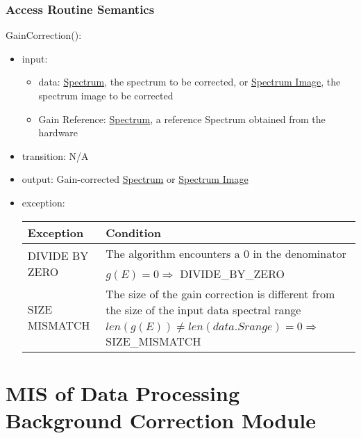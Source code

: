 \documentclass[12pt, titlepage]{article}
\begin{document}
\subsubsection{Access Routine Semantics}
\noindent GainCorrection():
\begin{itemize}
    \item input: 
    \begin{itemize}
        \item data: \hyperref[Mod:Spectrum]{Spectrum}, the spectrum to be
        corrected, or \hyperref[Mod:SI]{Spectrum Image}, the spectrum image to be
        corrected
        \item Gain Reference: \hyperref[Mod:Spectrum]{Spectrum}, a reference
        Spectrum obtained from the hardware
    \end{itemize}
    \item transition: N/A
    \item output: Gain-corrected \hyperref[Mod:Spectrum]{Spectrum} or
    \hyperref[Mod:SI]{Spectrum Image}
    \item exception:
    \begin{center}
        \begin{tabular}{p{3.5cm} p{12cm}}
            \toprule[0.15em]
            \textbf{Exception} & \textbf{Condition}\\
            \midrule[0.1em]
            \multirow{2}{0.25\textwidth}{DIVIDE BY ZERO} & The algorithm
            encounters a 0 in the denominator\\ 
            & $g(E) = 0 \Rightarrow$ DIVIDE\_BY\_ZERO\\ 
            \midrule[0.05em]
            \multirow{2}{0.25\textwidth}{SIZE MISMATCH} & The size of the gain
            correction is different from the size of the input data spectral range\\ 
            & $len(g(E)) \neq len(data.Srange) = 0 \Rightarrow$ SIZE\_MISMATCH\\
            
            \bottomrule[0.15em]
        \end{tabular}
    \end{center}
\end{itemize}

\newpage
\section{MIS of Data Processing Background Correction Module}
\label{Mod:BackgroundCorr}
\end{document}
